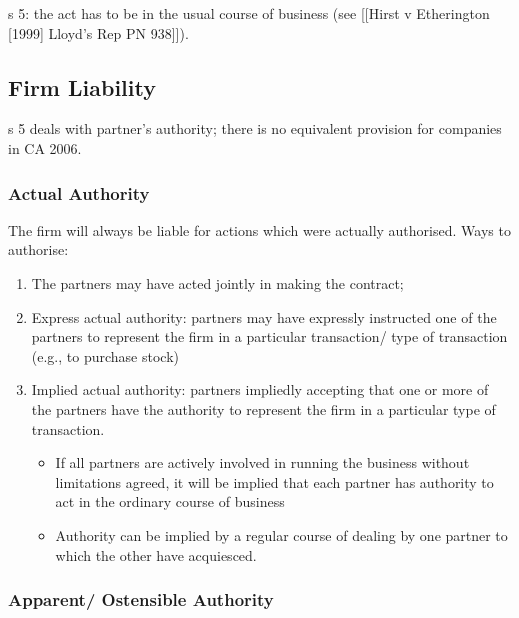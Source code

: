 \documentclass[
]{article}
\providecommand{\tightlist}{%
  \setlength{\itemsep}{0pt}\setlength{\parskip}{0pt}}
\begin{document}
s 5: the act has to be in the usual course of business (see {[}{[}Hirst
v Etherington {[}1999{]} Lloyd's Rep PN 938{]}{]}).

\hypertarget{firm-liability}{%
\subsection{Firm Liability}\label{firm-liability}}

s 5 deals with partner's authority; there is no equivalent provision for
companies in CA 2006.

\hypertarget{actual-authority}{%
\subsubsection{Actual Authority}\label{actual-authority}}

The firm will always be liable for actions which were actually
authorised. Ways to authorise:

\begin{enumerate}
\def\labelenumi{\arabic{enumi}.}
\tightlist
\item
  The partners may have acted jointly in making the contract;
\item
  Express actual authority: partners may have expressly instructed one
  of the partners to represent the firm in a particular transaction/
  type of transaction (e.g., to purchase stock)
\item
  Implied actual authority: partners impliedly accepting that one or
  more of the partners have the authority to represent the firm in a
  particular type of transaction.

  \begin{itemize}
  \tightlist
  \item
    If all partners are actively involved in running the business
    without limitations agreed, it will be implied that each partner has
    authority to act in the ordinary course of business
  \item
    Authority can be implied by a regular course of dealing by one
    partner to which the other have acquiesced.
  \end{itemize}
\end{enumerate}

\hypertarget{apparent-ostensible-authority}{%
\subsubsection{Apparent/ Ostensible
Authority}\label{apparent-ostensible-authority}}
\end{document}
